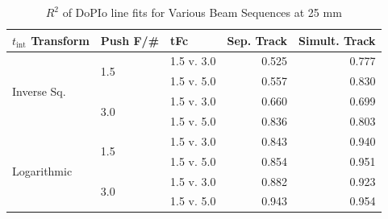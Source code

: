 \begin{table}[htbp]
    \caption{$R^2$ of DoPIo line fits for Various Beam Sequences at 25 mm}
    \centering
    \begin{tabular}{lllrr}
    $t_{\mathrm{int}}$ Transform & Push F/\# & tFc & Sep. Track & Simult. Track \\ \hline
    \multirow{4}{*}{Inverse Sq.} & \multirow{2}{*}{1.5} & 1.5 v. 3.0 & 0.525 & 0.777 \\ \cline{3-5} 
     &  & 1.5 v. 5.0 & 0.557  & 0.830 \\ \cline{2-5} 
     & \multirow{2}{*}{3.0} & 1.5 v. 3.0 & 0.660 & 0.699 \\ \cline{3-5} 
     &  & 1.5 v. 5.0 & 0.836 & 0.803 \\ \hline
    \multirow{4}{*}{Logarithmic} & \multirow{2}{*}{1.5} & 1.5 v. 3.0 & 0.843 & 0.940 \\ \cline{3-5} 
     &  & 1.5 v. 5.0 & 0.854 & 0.951 \\ \cline{2-5} 
     & \multirow{2}{*}{3.0} & 1.5 v. 3.0 & 0.882 & 0.923 \\ \cline{3-5} 
     &  & 1.5 v. 5.0 & 0.943 & 0.954 \\ \hline
    \end{tabular}
    \label{tbl:modelr2}
\end{table}

